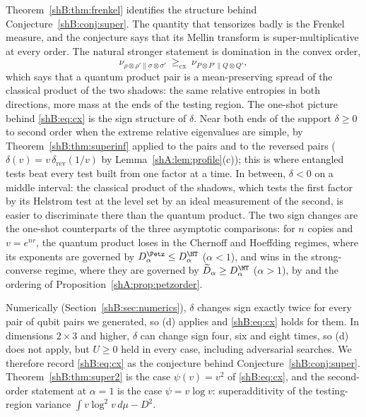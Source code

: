 Theorem~\ref{shB:thm:frenkel} identifies the structure behind Conjecture~\ref{shB:conj:super}. The quantity that tensorizes badly is the Frenkel measure, and the conjecture says that its Mellin transform is super-multiplicative at every order. The natural stronger statement is domination in the convex order,
\begin{equation}\label{shB:eq:cx}
\nu_{\rho\otimes\rho'\|\sigma\otimes\sigma'}\ \ge_{\mathrm{cx}}\ \nu_{P\otimes P'\|Q\otimes Q'} ,
\end{equation}
which says that a quantum product pair is a mean-preserving spread of the classical product of the two shadows: the same relative entropies in both directions, more mass at the ends of the testing region. The one-shot picture behind \eqref{shB:eq:cx} is the sign structure of $\delta$. Near both ends of the support $\delta\ge0$ to second order when the extreme relative eigenvalues are simple, by Theorem~\ref{shB:thm:superinf} applied to the pairs and to the reversed pairs ($\delta(v)=v\,\delta_{\mathrm{rev}}(1/v)$ by Lemma~\ref{shA:lem:profile}(c)); this is where entangled tests beat every test built from one factor at a time. In between, $\delta<0$ on a middle interval: the classical product of the shadows, which tests the first factor by its Helstrom test at the level set by an ideal measurement of the second, is easier to discriminate there than the quantum product. The two sign changes are the one-shot counterparts of the three asymptotic comparisons: for $n$ copies and $v=e^{nr}$, the quantum product loses in the Chernoff and Hoeffding regimes, where its exponents are governed by $D^\Petz_\alpha\le D^\HT_\alpha$ ($\alpha<1$), and wins in the strong-converse regime, where they are governed by $\widetilde D_\alpha\ge D^\HT_\alpha$ ($\alpha>1$), by \cite{AudenaertChernoff2007,Hayashi2007,Nagaoka2006,MosonyiOgawa2015} and the ordering of Proposition~\ref{shA:prop:petzorder}.

Numerically (Section~\ref{shB:sec:numerics}), $\delta$ changes sign exactly twice for every pair of qubit pairs we generated, so (d) applies and \eqref{shB:eq:cx} holds for them. In dimensions $2\times3$ and higher, $\delta$ can change sign four, six and eight times, so (d) does not apply, but $U\ge0$ held in every case, including adversarial searches. We therefore record \eqref{shB:eq:cx} as the conjecture behind Conjecture~\ref{shB:conj:super}. Theorem~\ref{shB:thm:super2} is the case $\psi(v)=v^2$ of \eqref{shB:eq:cx}, and the second-order statement at $\alpha=1$ is the case $\psi=v\log v$: superadditivity of the testing-region variance $\int v\log^2v\,d\mu-D^2$.

